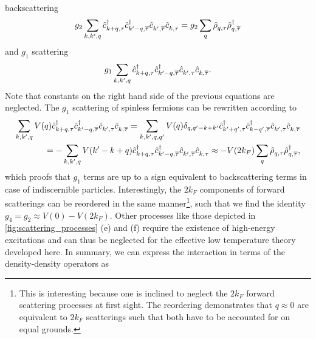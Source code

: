 backscattering
\begin{align}
    g_2\sum_{k,k',q}\hat c^\dag_{k+q,\tau}\hat c^\dag_{k'-q,\overline\tau}\hat c^\pdag_{k',\overline\tau}\hat c^\pdag_{k,\tau} = g_2\sum_q \hat\rho^\pdag_{q,\tau}\hat\rho^\dag_{q,\overline\tau}
\end{align}
and $g_1$ scattering
\begin{align}
    g_1\sum_{k,k',q} \hat c^\dag_{k+q,\tau}\hat c^\dag_{k'-q,\overline\tau}\hat c^\pdag_{k',\tau}\hat c^\pdag_{k,\overline\tau}.
\end{align}
Note that constants on the right hand side of the previous equations are neglected.
The $g_1$ scattering of spinless fermions can be rewritten according to
\begin{align}
    \sum_{k,k',q}V(q)
    \hat c^\dag_{k+q,\tau}\hat c^\dag_{k'-q,\overline\tau}\hat c^\pdag_{k',\tau}\hat c^\pdag_{k,\overline\tau}
    =
    \sum_{k,k',q,q'}V(q) \delta_{q,q'-k+k'}
    \hat c^\dag_{k'+q',\tau}\hat c^\dag_{k-q',\overline\tau}\hat c^\pdag_{k',\tau}\hat c^\pdag_{k,\overline\tau}
    \\
    =
    -\sum_{k,k',q}V(k'-k+q)\hat c^\dag_{k+q,\tau}\hat c^\dag_{k'-q,\overline\tau}\hat c^\pdag_{k',\overline\tau}\hat c^\pdag_{k,\tau}
    \approx -V(2k_F)\sum_q\hat\rho^\pdag_{q,\tau}\hat\rho^\dag_{q,\overline\tau},
    \label{eq:umklapp_backscattering_equivalence}
\end{align}
which proofs that $g_1$ terms are up to a sign equivalent to backscattering terms in case of indiscernible particles.
Interestingly, the $2k_F$ components of forward scatterings can be reordered in the same manner\footnote{This is interesting because one is inclined to neglect the $2k_F$ forward scattering processes at first sight. The reordering demonstrates that $q\approx0$ are equivalent to $2k_F$ scatterings such that both have to be accounted for on equal grounds.}, such that we find the identity $g_4 = g_2 \approx V(0)-V(2k_F)$.
Other processes like those depicted in \cref{fig:scattering_processes} (e) and (f) require the existence of high-energy excitations and can thus be neglected for the effective low temperature theory developed here.
In summary, we can express the interaction in terms of the density-density operators as
